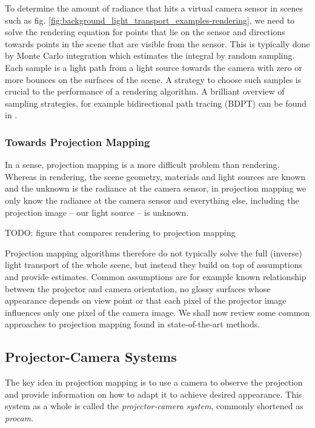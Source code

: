To determine the amount of radiance that hits a virtual camera sensor in scenes such as fig. \ref{fig:background_light_transport_examples-rendering}, we need to solve the rendering equation for points that lie on the sensor and directions towards points in the scene that are visible from the sensor. This is typically done by Monte Carlo integration which estimates the integral by random sampling. Each sample is a light path from a light source towards the camera with zero or more bounces on the surfaces of the scene. A strategy to choose such samples is crucial to the performance of a rendering algorithm. A brilliant overview of sampling strategies, for example bidirectional path tracing (BDPT) can be found in \citet{Veach1997}.

\subsubsection{Towards Projection Mapping}
\label{section:background-projection_mapping-light_transport-towards_projection_mapping}

In a sense, projection mapping is a more difficult problem than rendering. Whereas in rendering, the scene geometry, materials and light sources are known and the unknown is the radiance at the camera sensor, in projection mapping we only know the radiance at the camera sensor and everything else, including the projection image -- our light source -- is unknown.

{\color{red} TODO: figure that compares rendering to projection mapping}

Projection mapping algorithms therefore do not typically solve the full (inverse) light transport of the whole scene, but instead they build on top of assumptions and provide estimates. Common assumptions are for example known relationship between the projector and camera orientation, no glossy surfaces whose appearance depends on view point or that each pixel of the projector image influences only one pixel of the camera image. We shall now review some common approaches to projection mapping found in state-of-the-art methods.

\subsection{Projector-Camera Systems}
\label{section:background-projection_mapping-procams}

The key idea in projection mapping is to use a camera to observe the projection and provide information on how to adapt it to achieve desired appearance. This system as a whole is called the \textit{projector-camera system}, commonly shortened as \textit{procam}.

